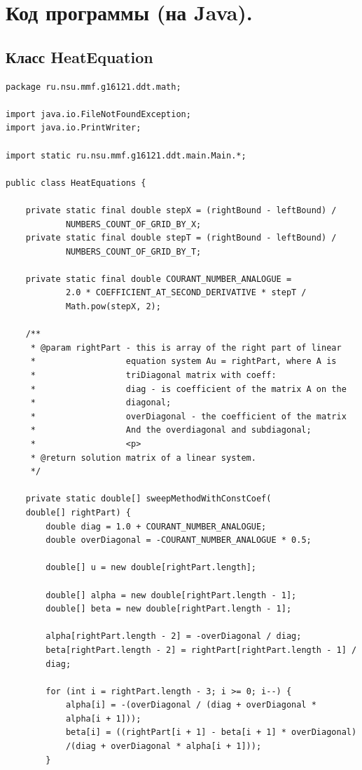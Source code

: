 \documentclass[12pt,a4paper]{scrartcl}
\begin{document}
\section{Код программы (на Java).}
\subsection{Класс HeatEquation}
\begin{verbatim}
package ru.nsu.mmf.g16121.ddt.math;

import java.io.FileNotFoundException;
import java.io.PrintWriter;

import static ru.nsu.mmf.g16121.ddt.main.Main.*;

public class HeatEquations {

    private static final double stepX = (rightBound - leftBound) /
            NUMBERS_COUNT_OF_GRID_BY_X;
    private static final double stepT = (rightBound - leftBound) /
            NUMBERS_COUNT_OF_GRID_BY_T;

    private static final double COURANT_NUMBER_ANALOGUE =
            2.0 * COEFFICIENT_AT_SECOND_DERIVATIVE * stepT /
            Math.pow(stepX, 2);

    /**
     * @param rightPart - this is array of the right part of linear
     *                  equation system Au = rightPart, where A is
     *                  triDiagonal matrix with coeff:
     *                  diag - is coefficient of the matrix A on the 
     *                  diagonal;
     *                  overDiagonal - the coefficient of the matrix
     *                  And the overdiagonal and subdiagonal;
     *                  <p>
     * @return solution matrix of a linear system.
     */

    private static double[] sweepMethodWithConstCoef(
    double[] rightPart) {
        double diag = 1.0 + COURANT_NUMBER_ANALOGUE;
        double overDiagonal = -COURANT_NUMBER_ANALOGUE * 0.5;

        double[] u = new double[rightPart.length];

        double[] alpha = new double[rightPart.length - 1];
        double[] beta = new double[rightPart.length - 1];

        alpha[rightPart.length - 2] = -overDiagonal / diag;
        beta[rightPart.length - 2] = rightPart[rightPart.length - 1] /
        diag;

        for (int i = rightPart.length - 3; i >= 0; i--) {
            alpha[i] = -(overDiagonal / (diag + overDiagonal * 
            alpha[i + 1]));
            beta[i] = ((rightPart[i + 1] - beta[i + 1] * overDiagonal)
            /(diag + overDiagonal * alpha[i + 1]));
        }


\end{verbatim}
\end{document}
